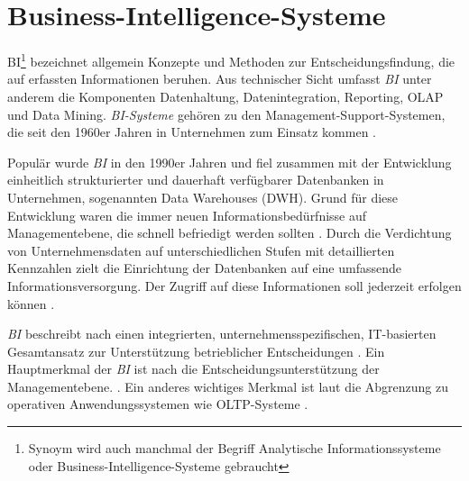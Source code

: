 

\section{Business-Intelligence-Systeme}
\acrfull{BI}\footnote{Synoym wird auch manchmal der Begriff Analytische Informationssysteme oder Business-Intelligence-Systeme gebraucht}
bezeichnet allgemein Konzepte und Methoden zur Entscheidungsfindung, die auf
erfassten Informationen beruhen. Aus technischer Sicht umfasst \textit{\acrshort{BI}} unter anderem die Komponenten Datenhaltung, Datenintegration, Reporting, \acrfull{OLAP} und Data Mining.
\textit{\acrshort{BI}-Systeme} gehören zu den Management-Support-Systemen, die seit den 1960er Jahren in Unternehmen zum Einsatz kommen \cite[vgl.][83]{gronwald_integrierte_2020}.

Populär wurde \textit{\acrshort{BI}} in den 1990er Jahren und fiel zusammen mit der 
Entwicklung einheitlich strukturierter und dauerhaft verfügbarer Datenbanken in Unternehmen, sogenannten Data Warehouses (DWH).
Grund für diese Entwicklung waren die immer neuen Informationsbedürfnisse auf Managementebene, 
die schnell befriedigt werden sollten \cite[vgl.][268 f.]{abts_grundkurs_2017}.
Durch die Verdichtung von Unternehmensdaten auf unterschiedlichen Stufen mit detaillierten Kennzahlen
zielt die Einrichtung der Datenbanken auf eine umfassende Informationsversorgung.
Der Zugriff auf diese Informationen soll jederzeit erfolgen können \cite[vgl.][267]{abts_grundkurs_2017}. 

\textit{\acrshort{BI}} beschreibt nach \citeauthor{abts_grundkurs_2017} einen integrierten, unternehmensspezifischen,
IT-basierten Gesamtansatz zur Unterstützung betrieblicher Entscheidungen \cite[vgl.][270]{abts_grundkurs_2017}. 
Ein Hauptmerkmal der \textit{\acrshort{BI}} ist nach  die Entscheidungsunterstützung der Managementebene.
\cite[vgl.][111]{linden_geschaftsmodellbasierte_2016}. Ein anderes wichtiges Merkmal ist laut \citeauthor{abts_grundkurs_2017} die Abgrenzung zu operativen
Anwendungssystemen wie \acrfull{OLTP}-Systeme \cite[vgl.][267]{abts_grundkurs_2017}. 


